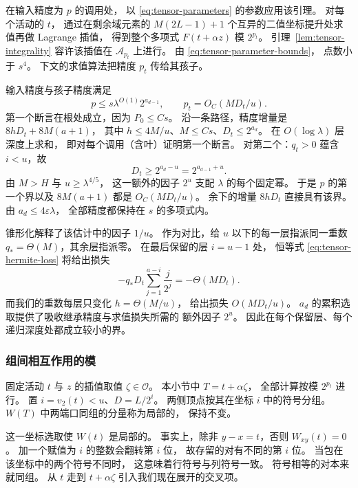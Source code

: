 在输入精度为 $p$ 的调用处，
以 \eqref{eq:tensor-parameters} 的参数应用该引理。
对每个活动的 $t$，
通过在剩余域元素的 $M(2L-1)+1$
个互异的二值坐标提升处求值再做 Lagrange 插值，
得到整个多项式 $F(t+\alpha z)$ 模 $2^{p_t}$。
引理~\ref{lem:tensor-integrality}
容许该插值在 $\mathcal A_{p_t}$ 上进行。
由 \eqref{eq:tensor-parameter-bounds}，
点数小于 $s^4$。
下文的求值算法把精度 $p_t$ 传给其孩子。

输入精度与孩子精度满足
\begin{equation}\label{eq:tensor-precision-bound}
 p\le s\lambda^{O(1)}2^{a_{d-1}},
 \qquad
 p_t=O_C(MD_t/u).
\end{equation}
第一个断言在根处成立，因为 $P_0\le Cs$。
沿一条路径，精度增量是 $8hD_t+8M(a+1)$，
其中 $h\le4M/u$、$M\le Cs$、$D_t\le2^{a_d}$。
在 $O(\log\lambda)$ 层深度上求和，
即对每个调用（含叶）证明第一个断言。
对第二个：$q_t>0$ 蕴含 $i<u$，故
\[
 D_t\ge2^{a_d-u}=2^{a_{d-1}+u}.
\]
由 $M>H$ 与 $u\ge\lambda^{4/5}$，
这一额外的因子 $2^u$
支配 $\lambda$ 的每个固定幂。
于是 $p$ 的第一个界以及 $8M(a+1)$
都是 $O_C(MD_t/u)$。
余下的增量 $8hD_t$ 直接具有该界。
由 $a_d\le4\varepsilon\lambda$，
全部精度都保持在 $s$ 的多项式内。

锥形化解释了该估计中的因子 $1/u$。
作为对比，给 $u$ 以下的每一层指派同一重数
$q_*=\Theta(M)$，其余层指派零。
在最后保留的层 $i=u-1$ 处，
恒等式 \eqref{eq:tensor-hermite-loss}
将给出损失
\[
 -q_*D_t\sum_{j=1}^{a-i}\frac{j}{2^j}=-\Theta(MD_t).
\]
而我们的重数每层只变化 $h=\Theta(M/u)$，
给出损失 $O(MD_t/u)$。
$a_d$ 的累积选取提供了吸收继承精度与求值损失所需的
额外因子 $2^u$。
因此在每个保留层、每个递归深度处都成立较小的界。

\subsubsection{组间相互作用的模}
\label{subsec:tensor-modes}

固定活动 $t$ 与 $z$ 的插值取值
$\zeta\in\mathcal O$。
本小节中 $T=t+\alpha\zeta$，
全部计算按模 $2^{p_t}$ 进行。
置 $i=v_2(t)<u$、$D=L/2^i$。
两侧顶点按其在坐标 $i$ 中的符号分组。
$W(T)$ 中两端口同组的分量称为局部的，
保持不变。

这一坐标选取使 $W(t)$ 是局部的。
事实上，除非 $y-x=t$，否则 $W_{xy}(t)=0$。
加一个赋值为 $i$ 的整数会翻转第 $i$ 位，
故存留的对有不同的第 $i$ 位。
当包在该坐标中的两个符号不同时，
这意味着行符号与列符号一致。
符号相等的对本来就同组。
从 $t$ 走到 $t+\alpha\zeta$
引入我们现在展开的交叉项。

